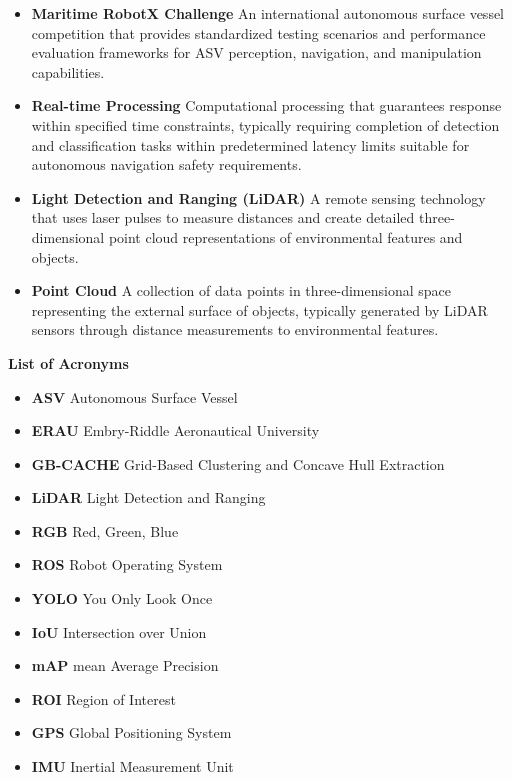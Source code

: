 \documentclass{erauthesis}
\begin{document}
\begin{itemize}[label={}]
    \item\textbf{Maritime RobotX Challenge} An international autonomous surface vessel competition that provides standardized testing scenarios and performance evaluation frameworks for ASV perception, navigation, and manipulation capabilities.
    
    \item\textbf{Real-time Processing} Computational processing that guarantees response within specified time constraints, typically requiring completion of detection and classification tasks within predetermined latency limits suitable for autonomous navigation safety requirements.
    
    \item\textbf{Light Detection and Ranging (LiDAR)} A remote sensing technology that uses laser pulses to measure distances and create detailed three-dimensional point cloud representations of environmental features and objects.
    
    \item\textbf{Point Cloud} A collection of data points in three-dimensional space representing the external surface of objects, typically generated by LiDAR sensors through distance measurements to environmental features.
\end{itemize}

\textbf{List of Acronyms}

\begin{itemize}[label={}]
    \item\textbf{ASV} Autonomous Surface Vessel
    \item\textbf{ERAU} Embry-Riddle Aeronautical University  
    \item\textbf{GB-CACHE} Grid-Based Clustering and Concave Hull Extraction
    \item\textbf{LiDAR} Light Detection and Ranging
    \item\textbf{RGB} Red, Green, Blue
    \item\textbf{ROS} Robot Operating System
    \item\textbf{YOLO} You Only Look Once
    \item\textbf{IoU} Intersection over Union
    \item\textbf{mAP} mean Average Precision
    \item\textbf{ROI} Region of Interest
    \item\textbf{GPS} Global Positioning System
    \item\textbf{IMU} Inertial Measurement Unit
\end{itemize}
\end{document}
